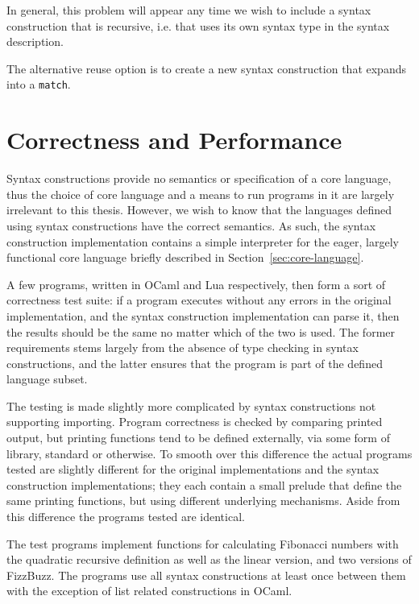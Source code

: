 \documentclass{kththesis}
\begin{document}
In general, this problem will appear any time we wish to include a syntax construction that is recursive, i.e. that uses its own syntax type in the syntax description. %

The alternative reuse option is to create a new syntax construction that expands into a \texttt{match}.

\section{Correctness and Performance}

Syntax constructions provide no semantics or specification of a core language, thus the choice of core language and a means to run programs in it are largely irrelevant to this thesis. However, we wish to know that the languages defined using syntax constructions have the correct semantics. As such, the syntax construction implementation contains a simple interpreter for the eager, largely functional core language briefly described in Section~\ref{sec:core-language}.

A few programs, written in OCaml and Lua respectively, then form a sort of correctness test suite: if a program executes without any errors in the original implementation, and the syntax construction implementation can parse it, then the results should be the same no matter which of the two is used. The former requirements stems largely from the absence of type checking in syntax constructions, and the latter ensures that the program is part of the defined language subset.

The testing is made slightly more complicated by syntax constructions not supporting importing. Program correctness is checked by comparing printed output, but printing functions tend to be defined externally, via some form of library, standard or otherwise. To smooth over this difference the actual programs tested are slightly different for the original implementations and the syntax construction implementations; they each contain a small prelude that define the same printing functions, but using different underlying mechanisms. Aside from this difference the programs tested are identical.

The test programs implement functions for calculating Fibonacci numbers with the quadratic recursive definition as well as the linear version, and two versions of FizzBuzz. The programs use all syntax constructions at least once between them with the exception of list related constructions in OCaml.
\end{document}
